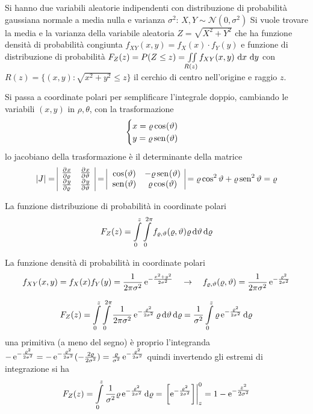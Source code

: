 \begin{esempio}
Si hanno due variabili aleatorie indipendenti con distribuzione di probabilità gaussiana normale a media nulla e varianza $\sigma^2$: $X,Y\sim\mathcal{N}(0,\sigma^2)$
Si vuole trovare la media e la varianza della variabile aleatoria $Z=\sqrt{X^2+Y^2}$ che ha funzione densità di probabilità congiunta $f_{XY}(x,y)=f_X(x)\cdot f_Y(y)$ e funzione di distribuzione di probabilità $F_Z(z)=P(Z\leq z)=\iint\limits_{R(z)}{f_{XY}(x,y)\,\diff x\,\diff y}$
con $R(z)=\{(x,y):\sqrt{x^2+y^2}\leq z\}$ il cerchio di centro nell'origine e raggio $z$. 

Si	 passa a coordinate polari per semplificare l'integrale doppio, cambiando le variabili $(x,y)$ in $\rho,\theta$, con la trasformazione \[\begin{cases}
x = \rho\cos{\theta}\\y = \rho\sen{\theta}
\end{cases}\]
lo jacobiano della trasformazione è il determinante della matrice \[\abs{J}=\begin{array}{|cc|}
\pderiv{x}{\rho}&\pderiv{x}{\theta}  \\ 
\pderiv{y}{\rho}&\pderiv{y}{\theta}  \\ \end{array}=\begin{array}{|cc|}
\cos{\theta}&-\rho\sen{\theta}  \\ 
\sen{\theta}&\rho\cos{\theta}  \\ 
\end{array}=\rho\Cos^2\theta+\rho\Sen^2\theta=\rho\]

La funzione distribuzione di probabilità in coordinate polari
\[F_Z(z)=\intd{0}{z}{\intd{0}{2\pi}{f_{\rho,\theta}(\rho,\theta) \rho}{\theta}}{\rho}\]

La funzione densità di probabilità in coordinate polari
\[f_{XY}(x,y)=f_X(x) f_Y(y)=\frac{1}{2\pi\sigma^2}\e{-\frac{x^2+y^2}{2\sigma^2}}\quad\to\quad f_{\rho,\theta}(\rho,\theta)=\frac{1}{2\pi\sigma^2}\e{-\frac{\rho^2}{2\sigma^2}}\]

\[F_Z(z)=\intd{0}{z}{\intd{0}{2\pi}{\frac{1}{2\pi\sigma^2}\e{-\frac{\rho^2}{2\sigma^2}}\rho}{\theta}}{\rho}=\frac{1}{\sigma^2}\intd{0}{z}{\rho\e{-\frac{\rho^2}{2\sigma^2}}}{\rho}\]
una primitiva (a meno del segno) è proprio l'integranda $-\e{-\frac{\rho^2}{2\sigma^2}}=-\e{-\frac{\rho^2}{2\sigma^2}}(-\frac{2\rho}{2\sigma^2})=\frac{\rho}{\sigma^2}\e{-\frac{\rho^2}{2\sigma^2}}$ quindi invertendo gli estremi di integrazione si ha
\[F_Z(z)=\intd{0}{z}{\frac{1}{\sigma^2}\rho\e{-\frac{\rho^2}{2\sigma^2}}}{\rho}=\bound{z}{0}{\e{-\frac{\rho^2}{2\sigma^2}}}=1-\e{-\tfrac{z^2}{2\sigma^2}}\]


\end{esempio}

